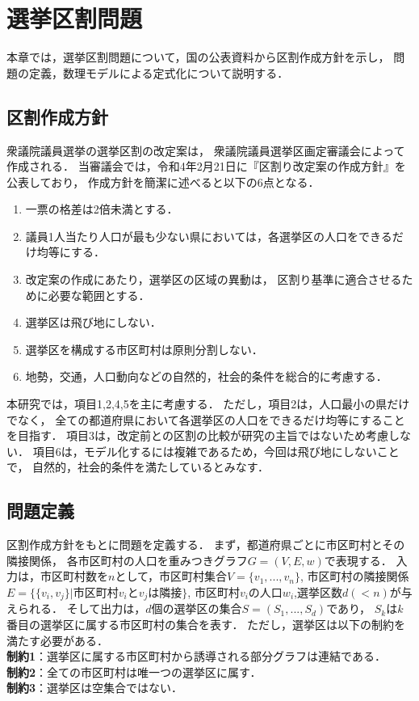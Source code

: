 \chapter{選挙区割問題} \label{chapter:2}

本章では，選挙区割問題について，国の公表資料から区割作成方針を示し，
問題の定義，数理モデルによる定式化について説明する．

\section{区割作成方針}
衆議院議員選挙の選挙区割の改定案は，
衆議院議員選挙区画定審議会によって作成される．
当審議会では，令和4年2月21日に『区割り改定案の作成方針』を公表しており，
作成方針を簡潔に述べると以下の6点となる．
\begin{enumerate}
    \item 一票の格差は2倍未満とする．
    \item 議員1人当たり人口が最も少ない県においては，各選挙区の人口をできるだけ均等にする．
    \item 改定案の作成にあたり，選挙区の区域の異動は，
    区割り基準に適合させるために必要な範囲とする．
    \item 選挙区は飛び地にしない．
    \item 選挙区を構成する市区町村は原則分割しない．
    \item 地勢，交通，人口動向などの自然的，社会的条件を総合的に考慮する．
\end{enumerate}

本研究では，項目1,2,4,5を主に考慮する．
ただし，項目2は，人口最小の県だけでなく，
全ての都道府県において各選挙区の人口をできるだけ均等にすることを目指す．
項目3は，改定前との区割の比較が研究の主旨ではないため考慮しない．
項目6は，モデル化するには複雑であるため，今回は飛び地にしないことで，
自然的，社会的条件を満たしているとみなす．

\section{問題定義}

区割作成方針をもとに問題を定義する．
まず，都道府県ごとに市区町村とその隣接関係，
各市区町村の人口を重みつきグラフ$G=(V, E, w)$で表現する．
入力は，市区町村数を$n$として，市区町村集合$V=\{v_1,...,v_n\}$, 
市区町村の隣接関係$E=\{\{v_i,v_j\}|$市区町村$v_i$と$v_j$は隣接$\}$, 
市区町村$v_i$の人口$w_i$,選挙区数$d(<n)$が与えられる．
そして出力は，$d$個の選挙区の集合$S=(S_1,...,S_d)$であり，
$S_k$は$k$番目の選挙区に属する市区町村の集合を表す．
ただし，選挙区は以下の制約を満たす必要がある．\\
\quad\textbf{制約1}：選挙区に属する市区町村から誘導される部分グラフは連結である．\\
\quad\textbf{制約2}：全ての市区町村は唯一つの選挙区に属す．\\
\quad\textbf{制約3}：選挙区は空集合ではない．

